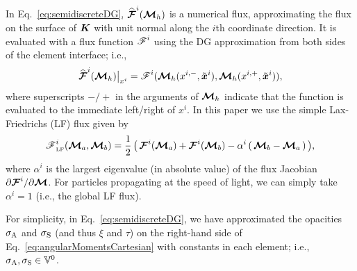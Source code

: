 In Eq.~\eqref{eq:semidiscreteDG}, $\widehat{\boldsymbol{\mathcal{F}}}^{i}(\boldsymbol{\mathcal{M}}_{h})$ is a numerical flux, approximating the flux on the surface of $\boldsymbol{K}$ with unit normal along the $i$th coordinate direction.  
It is evaluated with a flux function $\boldsymbol{\mathscr{F}}^{i}$ using the DG approximation from both sides of the element interface; i.e.,
\begin{equation}
  \widehat{\boldsymbol{\mathcal{F}}}^{i}(\boldsymbol{\mathcal{M}}_{h})\big|_{x^{i}}=\boldsymbol{\mathscr{F}}^{i}(\boldsymbol{\mathcal{M}}_{h}(x^{i,-},\tilde{\boldsymbol{x}}^{i}),\boldsymbol{\mathcal{M}}_{h}(x^{i,+},\tilde{\boldsymbol{x}}^{i})),
\end{equation}
where superscripts $-/+$ in the arguments of $\boldsymbol{\mathcal{M}}_{h}$ indicate that the function is evaluated to the immediate left/right of $x^{i}$.  
In this paper we use the simple Lax-Friedrichs (LF) flux given by
\begin{equation}
  \boldsymbol{\mathscr{F}}_{\mbox{\tiny LF}}^{i}(\boldsymbol{\mathcal{M}}_{a},\boldsymbol{\mathcal{M}}_{b})
  =\frac{1}{2}\,\big(\,\boldsymbol{\mathcal{F}}^{i}(\boldsymbol{\mathcal{M}}_{a})+\boldsymbol{\mathcal{F}}^{i}(\boldsymbol{\mathcal{M}}_{b})-\alpha^{i}\,(\,\boldsymbol{\mathcal{M}}_{b}-\boldsymbol{\mathcal{M}}_{a}\,)\,\big),
  \label{eq:fluxFunctionLF}
\end{equation}
where $\alpha^{i}$ is the largest eigenvalue (in absolute value) of the flux Jacobian $\partial\boldsymbol{\mathcal{F}}^{i}/\partial\boldsymbol{\mathcal{M}}$.  
For particles propagating at the speed of light, we can simply take $\alpha^{i}=1$ (i.e., the global LF flux).  

\begin{rem}
For simplicity, in Eq.~\eqref{eq:semidiscreteDG}, we have approximated the opacities $\sigma_{{\rm A}}$ and $\sigma_{{\rm S}}$ (and thus $\xi$ and $\tau$) on the right-hand side of Eq.~\eqref{eq:angularMomentsCartesian} with constants in each element; i.e., $\sigma_{{\rm A}},\sigma_{{\rm S}}\in\mathbb{V}^{0}$.  
\end{rem}